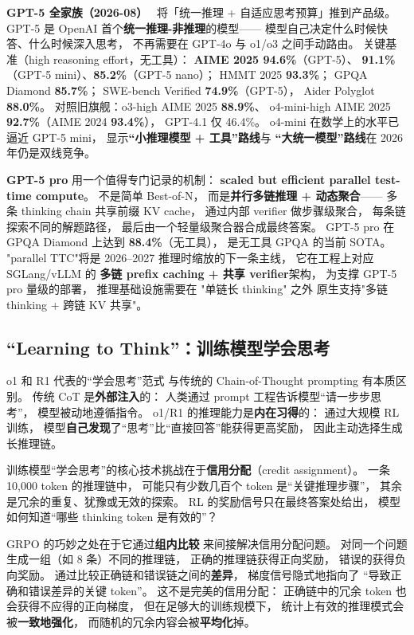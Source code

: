 \textbf{GPT-5 全家族（2026-08）}~\cite{openaigpt5_2026}
将「统一推理 + 自适应思考预算」推到产品级。
GPT-5 是 OpenAI 首个\textbf{统一推理-非推理}的模型——
模型自己决定什么时候快答、什么时候深入思考，
不再需要在 GPT-4o 与 o1/o3 之间手动路由。
关键基准（high reasoning effort，无工具）：
\textbf{AIME 2025 94.6\%}（GPT-5）、
\textbf{91.1\%}（GPT-5 mini）、\textbf{85.2\%}（GPT-5 nano）；
HMMT 2025 \textbf{93.3\%}；
GPQA Diamond \textbf{85.7\%}；
SWE-bench Verified \textbf{74.9\%}（GPT-5），
Aider Polyglot \textbf{88.0\%}。
对照旧旗舰：o3-high AIME 2025 \textbf{88.9\%}、
o4-mini-high AIME 2025 \textbf{92.7\%}（AIME 2024 \textbf{93.4\%}），
GPT-4.1 仅 46.4\%。
o4-mini 在数学上的水平已逼近 GPT-5 mini，
显示\textbf{“小推理模型 + 工具”路线}与
\textbf{“大统一模型”路线}在 2026 年仍是双线竞争。

\textbf{GPT-5 pro} 用一个值得专门记录的机制：
\textbf{scaled but efficient parallel test-time compute}。
不是简单 Best-of-N，
而是\textbf{并行多链推理 + 动态聚合}——
多条 thinking chain 共享前缀 KV cache，
通过内部 verifier 做步骤级聚合，
每条链探索不同的解题路径，
最后由一个轻量级聚合器合成最终答案。
GPT-5 pro 在 GPQA Diamond 上达到 \textbf{88.4\%}（无工具），
是无工具 GPQA 的当前 SOTA。
"parallel TTC"将是 2026--2027 推理时缩放的下一条主线，
它在工程上对应 SGLang/vLLM 的
\textbf{多链 prefix caching + 共享 verifier}架构，
为支撑 GPT-5 pro 量级的部署，
推理基础设施需要在
"单链长 thinking" 之外
原生支持"多链 thinking + 跨链 KV 共享"。

\subsection{“Learning to Think”：训练模型学会思考}

o1 和 R1 代表的“学会思考”范式
与传统的 Chain-of-Thought prompting 有本质区别。
传统 CoT 是\textbf{外部注入}的：
人类通过 prompt 工程告诉模型“请一步步思考”，
模型被动地遵循指令。
o1/R1 的推理能力是\textbf{内在习得}的：
通过大规模 RL 训练，
模型\textbf{自己发现}了“思考”比“直接回答”能获得更高奖励，
因此主动选择生成长推理链。

训练模型“学会思考”的核心技术挑战在于\textbf{信用分配}（credit assignment）。
一条 10,000 token 的推理链中，
可能只有少数几百个 token 是“关键推理步骤”，
其余是冗余的重复、犹豫或无效的探索。
RL 的奖励信号只在最终答案处给出，
模型如何知道“哪些 thinking token 是有效的”？

GRPO 的巧妙之处在于它通过\textbf{组内比较}
来间接解决信用分配问题。
对同一个问题生成一组（如 8 条）不同的推理链，
正确的推理链获得正向奖励，
错误的获得负向奖励。
通过比较正确链和错误链之间的\textbf{差异}，
梯度信号隐式地指向了
“导致正确和错误差异的关键 token”。
这不是完美的信用分配：
正确链中的冗余 token 也会获得不应得的正向梯度，
但在足够大的训练规模下，
统计上有效的推理模式会被\textbf{一致地强化}，
而随机的冗余内容会被\textbf{平均化}掉。

